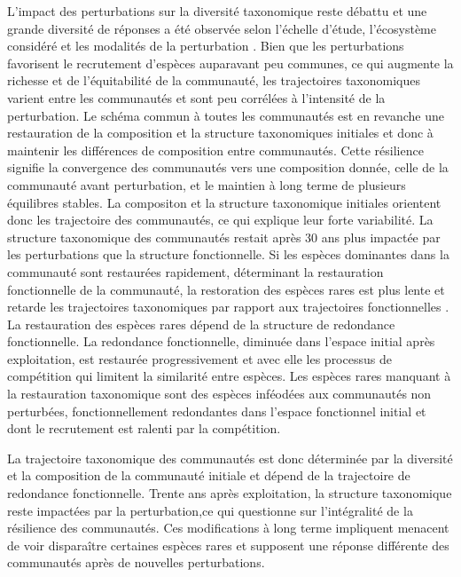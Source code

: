 \documentclass[
  11pt,
  french,
  A4paper,
  extrafontsizes,onecolumn,openright
  ]{memoir}
\begin{document}
L'impact des perturbations sur la diversité taxonomique reste débattu et
une grande diversité de réponses a été observée selon l'échelle d'étude,
l'écosystème considéré et les modalités de la perturbation
\autocite{refatrouver}. Bien que les perturbations favorisent le
recrutement d'espèces auparavant peu communes, ce qui augmente la
richesse et de l'équitabilité de la communauté, les trajectoires
taxonomiques varient entre les communautés et sont peu corrélées à
l'intensité de la perturbation. Le schéma commun à toutes les
communautés est en revanche une restauration de la composition et la
structure taxonomiques initiales et donc à maintenir les différences de
composition entre communautés. Cette résilience signifie la convergence
des communautés vers une composition donnée, celle de la communauté
avant perturbation, et le maintien à long terme de plusieurs équilibres
stables. La compositon et la structure taxonomique initiales orientent
donc les trajectoire des communautés, ce qui explique leur forte
variabilité. La structure taxonomique des communautés restait après 30
ans plus impactée par les perturbations que la structure fonctionnelle.
Si les espèces dominantes dans la communauté sont restaurées rapidement,
déterminant la restauration fonctionnelle de la communauté, la
restoration des espèces rares est plus lente et retarde les trajectoires
taxonomiques par rapport aux trajectoires fonctionnelles . La
restauration des espèces rares dépend de la structure de redondance
fonctionnelle. La redondance fonctionnelle, diminuée dans l'espace
initial après exploitation, est restaurée progressivement et avec elle
les processus de compétition qui limitent la similarité entre espèces.
Les espèces rares manquant à la restauration taxonomique sont des
espèces inféodées aux communautés non perturbées, fonctionnellement
redondantes dans l'espace fonctionnel initial et dont le recrutement est
ralenti par la compétition.

La trajectoire taxonomique des communautés est donc déterminée par la
diversité et la composition de la communauté initiale et dépend de la
trajectoire de redondance fonctionnelle. Trente ans après exploitation,
la structure taxonomique reste impactées par la perturbation,ce qui
questionne sur l'intégralité de la résilience des communautés. Ces
modifications à long terme impliquent menacent de voir disparaître
certaines espèces rares et supposent une réponse différente des
communautés après de nouvelles perturbations.


\end{document}
